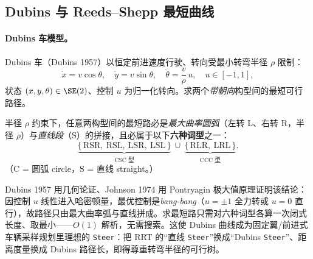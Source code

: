\subsection{Dubins 与 Reeds--Shepp 最短曲线}
\label{sec:plan-dubins}

\paragraph{Dubins 车模型。}
Dubins 车（Dubins 1957\cite{dubins1957curves}）以恒定前进速度行驶、转向受最小转弯半径 $\rho$ 限制：
\begin{equation}
  \dot x=v\cos\theta,\quad\dot y=v\sin\theta,\quad\dot\theta=\frac{v}{\rho}\,u,\quad u\in[-1,1],
  \label{eq:plan-dubins-model}
\end{equation}
状态 $(x,y,\theta)\in\SE(2)$、控制 $u$ 为归一化转向。求两个\emph{带朝向}构型间的最短可行路径。

\begin{theorem}\label{thm:plan-dubins}
半径 $\rho$ 约束下，任意两构型间的最短路必是\emph{最大曲率圆弧}（左转 L、右转 R，半径 $\rho$）与\emph{直线段}（S）的拼接，且必属于以下\textbf{六种词型}之一：
\begin{equation}
  \underbrace{\{\,\mathrm{RSR},\ \mathrm{RSL},\ \mathrm{LSR},\ \mathrm{LSL}\,\}}_{\text{CSC 型}}\ \cup\ \underbrace{\{\,\mathrm{RLR},\ \mathrm{LRL}\,\}}_{\text{CCC 型}}.
  \label{eq:plan-dubins-words}
\end{equation}
（C = 圆弧 circle，S = 直线 straight。）
\end{theorem}
\noindent Dubins 1957 用几何论证、Johnson 1974 用 Pontryagin 极大值原理证明该结论：因控制 $u$ 线性进入哈密顿量，最优控制是\emph{bang-bang}（$u=\pm1$ 全力转或 $u=0$ 直行），故路径只由最大曲率弧与直线拼成。求最短路只需对六种词型各算一次闭式长度、取最小——$O(1)$ 解析，无需搜索。这使 Dubins 曲线成为固定翼/前进式车辆采样规划里理想的 \texttt{Steer}：把 RRT 的“直线 \texttt{Steer}”换成“Dubins \texttt{Steer}”、距离度量换成 Dubins 路径长，即得尊重转弯半径的可行树。

